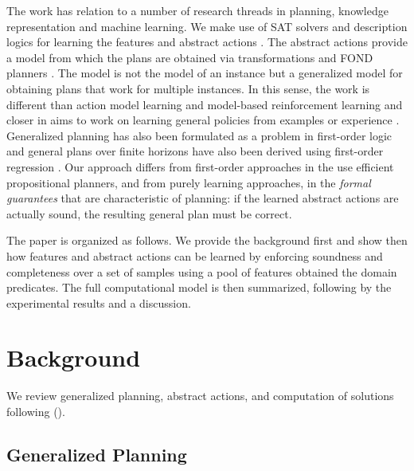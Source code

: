 \documentclass[letterpaper]{article} %
\newcommand{\citeay}[1]{\citeauthor{#1} (\citeyear{#1})}
\begin{document}
The work has relation to a number of research threads in planning, knowledge representation
and machine learning.  We make use of SAT solvers and description logics for learning the features
and abstract actions \cite{sat-handbook,dl-handbook}. The abstract actions provide a model from which the plans are obtained via
transformations and FOND planners \cite{geffner:book,ghallab:book}.
The model is not the model of an instance but a generalized model for  obtaining  plans
that work for multiple instances. In this sense, the work is different than
action model learning \cite{yang:action-learning} and model-based reinforcement learning
and closer in aims to work on learning general policies from examples or experience
\cite{martin:concept,fern:bias,mazebase,general-drl}. Generalized planning has  also been formulated as a problem in first-order logic
\cite{srivastava:generalized} and general plans over finite horizons have also been derived using  first-order regression
\cite{boutilier2001symbolic,wang2008first,van2012solving}. Our approach differs from first-order approaches in the use
efficient propositional planners, and from purely learning approaches, in the \emph{formal guarantees} that are characteristic of planning:
if the learned abstract actions are actually sound,  the resulting general plan must be correct. 


The paper is organized as follows. We provide the background first and  show then  how features and
abstract actions can be  learned by enforcing soundness and completeness over a set of samples  using 
a  pool of features obtained the   domain  predicates. The full  computational model  is then
summarized,  following by the experimental results and a discussion.

\section{Background}

We review generalized planning, abstract actions, and computation of solutions 
following  \citeay{bonet:ijcai2018}.

\subsection{Generalized Planning}
\end{document}
